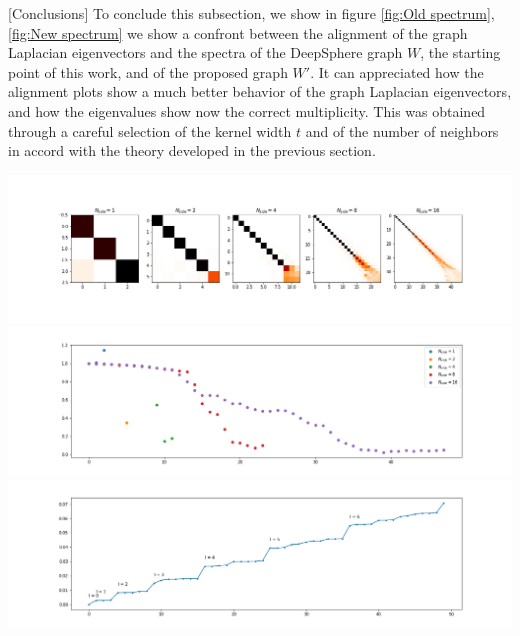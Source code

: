 [Conclusions]
To conclude this subsection, we show in figure \ref{fig:Old spectrum}, \ref{fig:New spectrum} we show a confront between the alignment of the graph Laplacian eigenvectors and the spectra of the DeepSphere graph $W$, the starting point of this work, and  of the proposed graph $W'$. It can appreciated how the alignment plots show a much better behavior of the graph Laplacian eigenvectors, and how the eigenvalues show now the correct multiplicity. This was obtained through a careful selection of the kernel width $t$ and of the number of neighbors in accord with the theory developed in the previous section. \\
\begin{minipage}{.5\textwidth}
	\centering
	\includegraphics[width=0.9\linewidth]{../codes/02.HeatKernelGraphLaplacian/HEALPix/06_figures/deepsphere_original.png}
	\includegraphics[width=0.9\linewidth]{../codes/02.HeatKernelGraphLaplacian/HEALPix/06_figures/deepsphere_original_diagonal.png}
	\includegraphics[width=0.9\linewidth]{../codes/02.HeatKernelGraphLaplacian/HEALPix/05_figs/old_results3.png}
	\label{fig:Old spectrum}
\end{minipage}%
